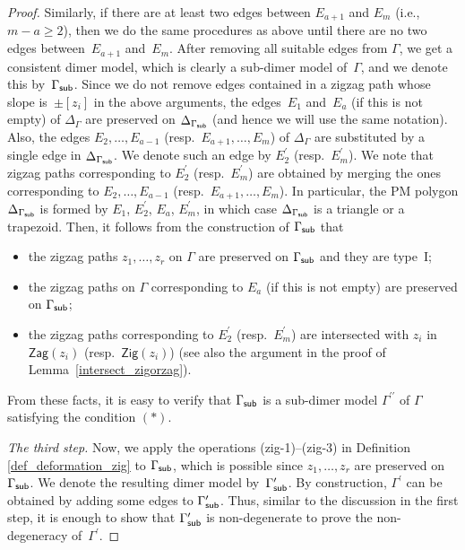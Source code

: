 \documentclass[pdftex]{sigma}%
\numberwithin{equation}{section}
\numberwithin{figure}{section}
\numberwithin{table}{section}
\newcommand{\Zig}{\mathsf{Zig}}
\newcommand{\Zag}{\mathsf{Zag}}
\begin{document}
\begin{proof}
Similarly, if there are at least two edges between $E_{a+1}$ and $E_m$ (i.e., $m-a \geq 2$), then we do the same procedures as above until there are no two edges between~$E_{a+1}$ and~$E_m$.
After removing all suitable edges from $\Gamma$, we get a consistent dimer model, which is clearly a sub-dimer model of~$\Gamma$,
and we denote this by~$\Gamma_{\sf sub}$.
Since we do not remove edges contained in a zigzag path whose slope is~$\pm[z_i]$ in the above arguments,
the edges~$E_1$ and~$E_a$ (if this is not empty) of $\Delta_\Gamma$ are preserved on $\Delta_{\Gamma_{\sf sub}}$ (and hence we will use the same notation).
Also, the edges $E_2,\dots,E_{a-1}$ (resp.~$E_{a+1},\dots,E_m$) of $\Delta_\Gamma$ are substituted by a single edge in $\Delta_{\Gamma_{\sf sub}}$.
We denote such an edge by $E_2^\prime$ (resp.~$E_m^\prime$).
We note that zigzag paths corresponding to $E_2^\prime$ (resp.~$E_m^\prime$) are obtained by merging the ones corresponding to $E_2,\dots,E_{a-1}$ (resp.~$E_{a+1},\dots,E_m$).
In particular, the PM polygon $\Delta_{\Gamma_{\sf sub}}$ is formed by $E_1$, $E_2^\prime$, $E_a$, $E_m^\prime$, in which case $\Delta_{\Gamma_{\sf sub}}$ is a triangle or a trapezoid.
Then, it follows from the construction of $\Gamma_{\sf sub}$ that
\begin{itemize}\itemsep=0pt
\item[--] the zigzag paths $z_1,\dots,z_r$ on $\Gamma$ are preserved on $\Gamma_{\sf sub}$ and they are type~I;
\item[--] the zigzag paths on $\Gamma$ corresponding to $E_a$ (if this is not empty) are preserved on $\Gamma_{\sf sub}$;
\item[--] the zigzag paths corresponding to $E_2^\prime$ (resp.~$E_m^\prime$) are intersected with $z_i$ in $\Zag(z_i)$ (resp.\ $\Zig(z_i)$)
(see also the argument in the proof of Lemma~\ref{intersect_zigorzag}).
\end{itemize}
From these facts, it is easy to verify that $\Gamma_{\sf sub}$ is a sub-dimer model $\Gamma^{\prime\prime}$ of $\Gamma$ satisfying the condition $(*)$.

{\it The third step.}
Now, we apply the operations (zig-1)--(zig-3) in Definition \ref{def_deformation_zig} to $\Gamma_{\sf sub}$,
which is possible since $z_1,\dots,z_r$ are preserved on~$\Gamma_{\sf sub}$.
We denote the resulting dimer model by~$\Gamma^\prime_{\sf sub}$.
By construction, $\Gamma^\prime$ can be obtained by adding some edges to $\Gamma^\prime_{\sf sub}$. Thus, similar to the discussion in the first step, it is enough to show that $\Gamma^\prime_{\sf sub}$ is non-degenerate to prove the non-degeneracy of~$\Gamma^\prime$.


\end{proof}
\end{document}
